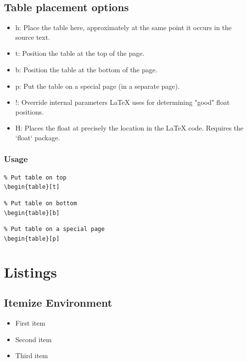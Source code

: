 \documentclass[12pt]{article}
\begin{document}
\subsection{Table placement options}

\begin{itemize}
    \item h: Place the table here, approximately at the same point it occurs in the source text.
    \item t: Position the table at the top of the page.
    \item b: Position the table at the bottom of the page.
	\item p: Put the table on a special page (in a separate page).
    \item !: Override internal parameters LaTeX uses for determining "good" float positions.
	\item H: Places the float at precisely the location in the LaTeX code. Requires the `float` package.		
\end{itemize}

\subsubsection{Usage}

\begin{verbatim}
% Put table on top 
\begin{table}[t]
\end{verbatim}

\begin{verbatim}
% Put table on bottom
\begin{table}[b]
\end{verbatim}

\begin{verbatim}
% Put table on a special page
\begin{table}[p]
\end{verbatim}



\section{Listings}

\subsection{Itemize Environment}
\begin{itemize}
    \item First item
    \item Second item
    \item Third item
\end{itemize}
\end{document}
